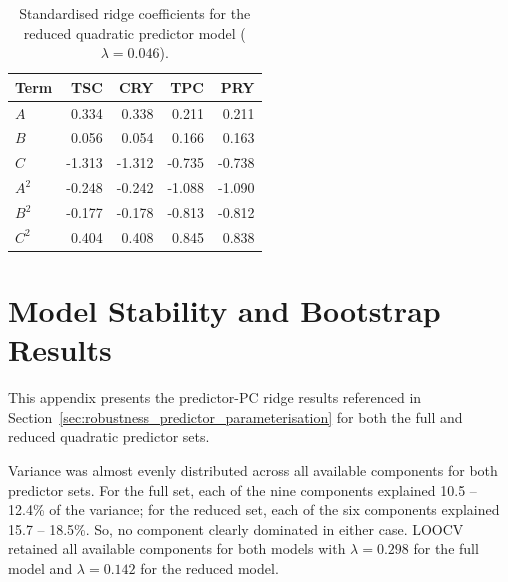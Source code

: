 \documentclass[MScDSA]{uccthesis}
\begin{document}
\begin{table}[H]
\centering
\small
\caption{Standardised ridge coefficients for the reduced quadratic predictor model ($\lambda = 0.046$).}
\label{tab:red_quad_ridge_coef}
\begin{tabular}{lrrrr}
\toprule
\textbf{Term} & \textbf{TSC} & \textbf{CRY} & \textbf{TPC} & \textbf{PRY} \\
\midrule
$A$ & 0.334 & 0.338 & 0.211 & 0.211 \\
$B$ & 0.056 & 0.054 & 0.166 & 0.163 \\
$C$ & -1.313 & -1.312 & -0.735 & -0.738 \\
$A^2$ & -0.248 & -0.242 & -1.088 & -1.090 \\
$B^2$ & -0.177 & -0.178 & -0.813 & -0.812 \\
$C^2$ & 0.404 & 0.408 & 0.845 & 0.838 \\
\bottomrule
\end{tabular}
\end{table}


\chapter{Model Stability and Bootstrap Results}
\label{app:robustness_and_stability}
This appendix presents the predictor-PC ridge results referenced in Section~\ref{sec:robustness_predictor_parameterisation} for both the full and reduced quadratic predictor sets.

Variance was almost evenly distributed across all available components for both predictor sets. For the full set, each of the nine components explained 10.5 -- 12.4\% of the variance; for the reduced set, each of the six components explained 15.7 -- 18.5\%. So, no component clearly dominated in either case. LOOCV retained all available components for both models with $\lambda = 0.298$ for the full model and $\lambda = 0.142$ for the reduced model.
\end{document}
